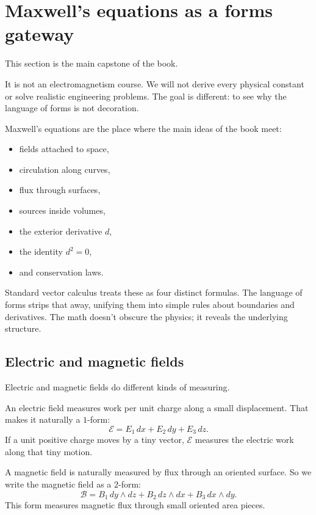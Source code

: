 \section{Maxwell's equations as a forms gateway}
\label{sec:19.4}

This section is the main capstone of the book.

It is not an electromagnetism course.  We will not derive every physical constant or
solve realistic engineering problems.  The goal is different: to see why the language of
forms is not decoration.

Maxwell's equations are the place where the main ideas of the book meet:
\begin{itemize}
    \item fields attached to space,
    \item circulation along curves,
    \item flux through surfaces,
    \item sources inside volumes,
    \item the exterior derivative \(d\),
    \item the identity \(d^2=0\),
    \item and conservation laws.
\end{itemize}

Standard vector calculus treats these as four distinct formulas. The language of forms strips that away, unifying them into simple rules about boundaries and derivatives. The math doesn't obscure the physics; it reveals the underlying structure.

\subsection{Electric and magnetic fields}

Electric and magnetic fields do different kinds of measuring.

An electric field measures work per unit charge along a small displacement.  That makes
it naturally a \(1\)-form:
\[
\boxed{
    \mathcal E
    =
    E_1\,dx+E_2\,dy+E_3\,dz.
}
\]
If a unit positive charge moves by a tiny vector, \(\mathcal E\) measures the electric
work along that tiny motion.

A magnetic field is naturally measured by flux through an oriented surface.  So we write
the magnetic field as a \(2\)-form:
\[
\boxed{
    \mathcal B
    =
    B_1\,dy\wedge dz
    +
    B_2\,dz\wedge dx
    +
    B_3\,dx\wedge dy.
}
\]
This form measures magnetic flux through small oriented area pieces.

